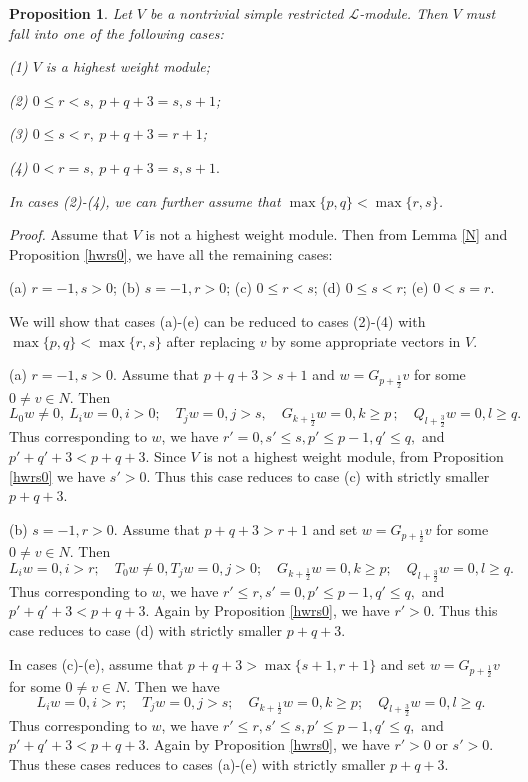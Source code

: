 \documentclass[12pt]{article}
\numberwithin{equation}{section}
\newtheorem{prop}[theo]{Proposition}
\begin{document}
\begin{prop} Let $V$ be a nontrivial simple restricted $\mathcal{L}$-module.  Then $V$ must fall into one of the following cases:

{\rm (1)} $V$ is a highest weight module;

{\rm (2)} $0\le r<s,\ p+q+3=s,s+1$;

{\rm (3)} $0\le s<r,\ p+q+3=r+1$;

{\rm (4)} $0<r=s,\ p+q+3=s,s+1.$

In  cases {\rm (2)}-{\rm (4)}, we can further assume that $\max\{p,q\}< \max\{r,s\}$.
\end{prop}

{\it Proof.} Assume that  $V$ is not a highest weight module. Then  from Lemma \ref{N} and Proposition \ref{hwrs0}, we have all the remaining cases:

 (a) $r=-1, s>0$;
(b) $s=-1,r>0$; (c) $0\le r<s$; (d) $0\le s<r$; (e) $0< s=r$.

 We  will show that  cases (a)-(e)  can be reduced to  cases (2)-(4) with $\max\{p,q\}< \max\{r,s\}$ after  replacing $v$ by some  appropriate vectors in $V$.

  (a) $r=-1, s>0$. Assume that $p+q+3>s+1$ and  $w=G_{p+\frac{1}{2}}v$ for some $0\ne v\in N$. Then
$$ L_0w\ne 0,\ L_iw=0,i>0; \quad T_jw=0, j>s, \quad G_{k+\frac{1}{2}}w=0,k\ge p\,; \quad  Q_{l+\frac{3}{2}}w=0, l\ge q.$$  Thus corresponding to $w$, we have $r'=0, s'\le s,p'\le p-1, q'\le q,$ and $p'+q'+3<p+q+3$. Since  $V$ is not a highest weight module, from Proposition \ref{hwrs0} we  have $s'>0$. Thus this case   reduces to  case (c) with  strictly smaller $p+q+3$.

  (b) $s=-1,r>0$. Assume that $p+q+3>r+1$ and  set  $w=G_{p+\frac{1}{2}}v$ for some $0\ne v\in N$. Then
 $$ L_iw=0,i>r; \quad T_0w\ne 0, T_jw=0,j>0;\quad G_{k+\frac{1}{2}}w=0,k\ge p; \quad  Q_{l+\frac{3}{2}}w=0, l\ge q.$$
Thus corresponding to $w$, we have $r'\le r, s'=0,p'\le p-1,q'\le q,$ and $p'+q'+3<p+q+3$.  Again by Proposition \ref{hwrs0}, we  have $r'>0$. Thus this case  reduces to case (d) with   strictly smaller $p+q+3$.

  In cases (c)-(e), assume that $p+q+3>\max\{s+1,r+1\}$ and set  $w=G_{p+\frac{1}{2}}v$ for some $0\ne v\in N$. Then we have
 $$ L_iw=0,i>r; \quad  T_jw=0,j>s;\quad G_{k+\frac{1}{2}}w=0,k\ge p; \quad  Q_{l+\frac{3}{2}}w=0, l\ge q.$$
Thus corresponding to $w$, we have $r'\le r, s'\le s,p'\le p-1, q'\le q,$  and $p'+q'+3<p+q+3$. Again by Proposition \ref{hwrs0}, we  have $r'>0$ or $s'>0$. Thus these cases   reduces to  cases (a)-(e)  with  strictly smaller $p+q+3$.
\end{document}
